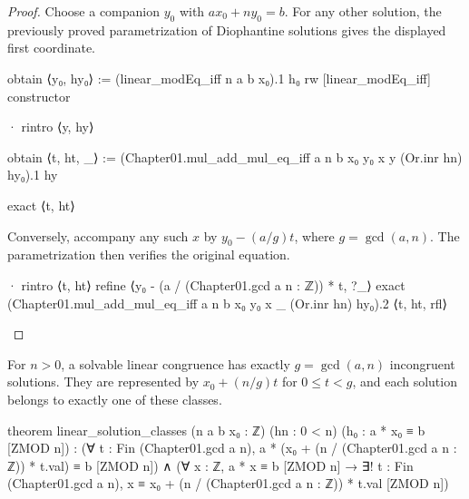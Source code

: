 \begin{proof}
  Choose a companion $y_0$ with $ax_0+ny_0=b$.
  For any other solution, the previously proved parametrization of Diophantine solutions gives the
  displayed first coordinate.

  \begin{lean}
    obtain ⟨y₀, hy₀⟩ := (linear_modEq_iff n a b x₀).1 h₀
    rw [linear_modEq_iff]
    constructor

    · rintro ⟨y, hy⟩

      obtain ⟨t, ht, _⟩ :=
        (Chapter01.mul_add_mul_eq_iff a n b x₀ y₀ x y (Or.inr hn) hy₀).1 hy

      exact ⟨t, ht⟩
  \end{lean}

  Conversely, accompany any such $x$ by $y_0-(a/g)t$, where $g=\gcd(a,n)$.
  The parametrization then verifies the original equation.

  \begin{lean}
    · rintro ⟨t, ht⟩
      refine ⟨y₀ - (a / (Chapter01.gcd a n : ℤ)) * t, ?_⟩
      exact (Chapter01.mul_add_mul_eq_iff a n b x₀ y₀ x _ (Or.inr hn) hy₀).2
        ⟨t, ht, rfl⟩
  \end{lean}
\end{proof}

\begin{theorem}
  \label{ent:thm:linear-solution-classes}
  For $n>0$, a solvable linear congruence has exactly $g=\gcd(a,n)$ incongruent solutions.
  They are represented by $x_0+(n/g)t$ for $0\le t<g$, and each solution belongs to exactly one of
  these classes.

  \begin{lean}
    theorem linear_solution_classes (n a b x₀ : ℤ) (hn : 0 < n)
        (h₀ : a * x₀ ≡ b [ZMOD n]) :
        (∀ t : Fin (Chapter01.gcd a n),
          a * (x₀ + (n / (Chapter01.gcd a n : ℤ)) * t.val) ≡ b [ZMOD n]) ∧
        (∀ x : ℤ, a * x ≡ b [ZMOD n] →
          ∃! t : Fin (Chapter01.gcd a n),
            x ≡ x₀ + (n / (Chapter01.gcd a n : ℤ)) * t.val [ZMOD n])
  \end{lean}
\end{theorem}

